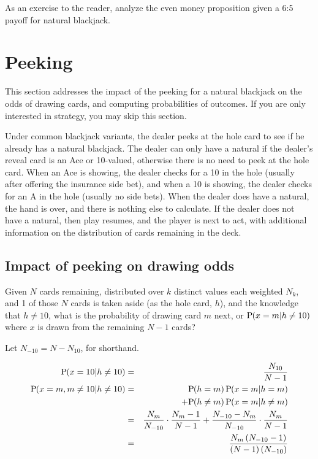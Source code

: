 As an exercise to the reader, analyze the even money proposition
given a 6:5 payoff for natural blackjack.

\section{Peeking}
\label{sec:basic:peeking}

This section addresses the impact of the peeking for a natural blackjack
on the odds of drawing cards, and computing probabilities of outcomes.
If you are only interested in strategy, you may skip this section.  

Under common blackjack variants, the dealer peeks at the hole card
to see if he already has a natural blackjack.
The dealer can only have a natural if the dealer's reveal card is an 
Ace or 10-valued, otherwise there is no need to peek at the hole card.
When an Ace is showing, the dealer checks for a 10 in the hole (usually 
after offering the insurance side bet), and when a 10 is showing, 
the dealer checks for an A in the hole (usually no side bets).
When the dealer does have a natural, the hand is over, 
and there is nothing else to calculate.
If the dealer does not have a natural, then play resumes, 
and the player is next to act, with additional information on the
distribution of cards remaining in the deck.

\subsection{Impact of peeking on drawing odds}
\label{sec:basic:peeking:drawing_odds}
Given $N$ cards remaining, distributed over $k$ distinct values 
each weighted $N_k$, and 1 of those $N$ cards is taken aside 
(as the hole card, $h$), and the knowledge that $h\neq{}10$, 
what is the probability of drawing card $m$ next, 
or $\textrm{P}\hspace{-.5ex}\left(x=m|h\neq{}10\right)$ where $x$ is drawn from the 
remaining $N-1$ cards?

Let $N_{-10}=N-N_{10}$, for shorthand.

\begin{eqnarray}
\textrm{P}\hspace{-.5ex}\left(x=10|h\neq{}10\right) &=& \frac{N_{10}}{N-1}\\
\textrm{P}\hspace{-.5ex}\left(x=m,m\neq{}10|h\neq{}10\right) &=&
  \textrm{P}\hspace{-.5ex}\left(h=m\right) \textrm{P}\hspace{-.5ex}\left(x=m|h=m\right) \nonumber \\
& &  +\textrm{P}\hspace{-.5ex}\left(h\neq{}m\right) \textrm{P}\hspace{-.5ex}\left(x=m|h\neq{}m\right)\\
&=& \frac{N_m}{N_{-10}}\cdot\frac{N_m-1}{N-1}
  +\frac{N_{-10}-N_m}{N_{-10}}\cdot\frac{N_m}{N-1}\\
&=& \frac{N_m\left(N_{-10}-1\right)}{\left(N-1\right)\left(N_{-10}\right)}
\end{eqnarray}

